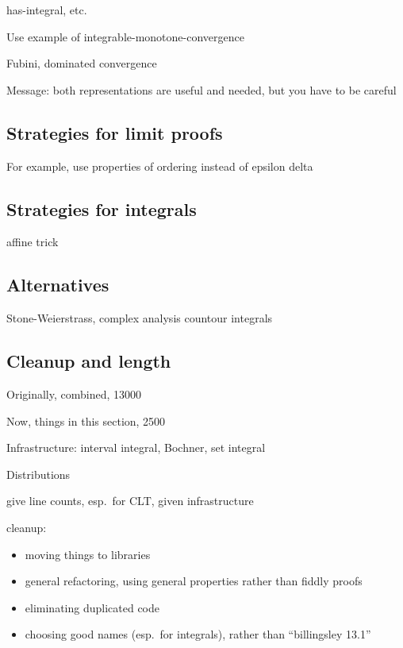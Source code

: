\documentclass{svjour3}
\newcommand{\todo}[1]{{\color{red}#1}}
\begin{document}
\todo{
has-integral, etc.

Use example of integrable-monotone-convergence



Fubini, dominated convergence

Message: both representations are useful and needed, but you have to be careful
}

\subsection{Strategies for limit proofs}

\todo{
For example, use properties of ordering instead of epsilon delta
}

\subsection{Strategies for integrals}

\todo{
affine trick
}

\subsection{Alternatives}

\todo{
Stone-Weierstrass, complex analysis countour integrals
}

\subsection{Cleanup and length}

\todo{
Originally, combined, 13000

Now, things in this section, 2500

Infrastructure: interval integral, Bochner, set integral

Distributions

give line counts, esp.~for CLT, given infrastructure


cleanup:
\begin{itemize}
 \item moving things to libraries
 \item general refactoring, using general properties rather than fiddly proofs
 \item eliminating duplicated code
 \item choosing good names (esp.~for integrals), rather than ``billingsley 13.1''
\end{itemize}
}



\end{document}
